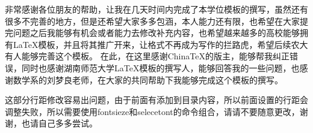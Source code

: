 \Thanks
{}

\fontsize{12pt}{18pt}
\par 非常感谢各位朋友的帮助，让我在几天时间内完成了本学位模板的撰写，虽然还有很多不完善的地方，但是还希望大家多多包涵，本人能力还有限，也希望在大家提完问题之后我能够有机会或者能力去修改补充内容，也希望越来越多的高校能够拥有\LaTeX 模板，并且将其推广开来，让格式不再成为写作的拦路虎，希望后续农大有人能够完善这个模板。
在此，在这里感谢ChinaTeX的版主，能够帮我纠正错误，同时也感谢湖南师范大学\LaTeX 模板的撰写人，能够回答我的一些问题，也感谢数学系的刘梦良老师，在大家的共同帮助下我能够完成这个模板的撰写。\selectfont

\fontsize{12pt}{18pt}
\par 这部分行距修改容易出问题，由于前面有添加到目录内容，所以前面设置的行距会调整失败，所以需要使用fontsieze和selecetont的命令组合，请请不要随意更改，谢谢，也请自己多多尝试。
\selectfont